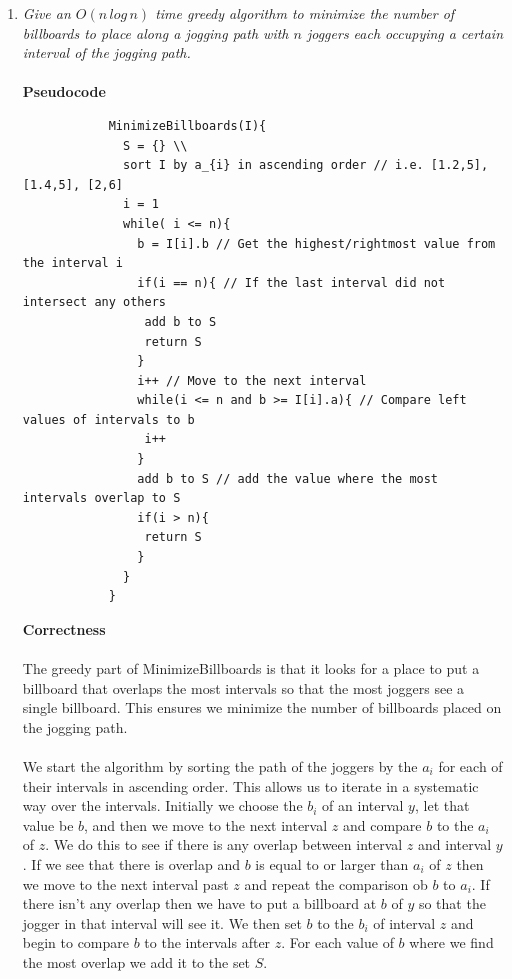 \documentclass[12pt]{article}
\begin{document}
\begin{enumerate}
			\newpage
			\item \textit{Give an $O(n\,log\,n)$ time greedy algorithm to minimize the number of billboards to place along a jogging path with $n$ joggers each occupying a certain interval of the jogging path.}\\
			\\
			\textbf{Pseudocode}\\
			\begin{verbatim}
			MinimizeBillboards(I){
			  S = {} \\ 
			  sort I by a_{i} in ascending order // i.e. [1.2,5], [1.4,5], [2,6]
			  i = 1
			  while( i <= n){
			    b = I[i].b // Get the highest/rightmost value from the interval i
			    if(i == n){ // If the last interval did not intersect any others
			     add b to S
			     return S
			    }
			    i++ // Move to the next interval
			    while(i <= n and b >= I[i].a){ // Compare left values of intervals to b
			     i++ 
			    }
			    add b to S // add the value where the most intervals overlap to S
			    if(i > n){
			     return S
			    }
			  }
			}
			\end{verbatim}
			\textbf{Correctness}\\
			\\
			The greedy part of MinimizeBillboards is that it looks for a place to put a billboard that overlaps the most intervals so that the most joggers see a single billboard.
			This ensures we minimize the number of billboards placed on the jogging path.\\
			\\
			We start the algorithm by sorting the path of the joggers by the $a_i$ for each of their intervals in ascending order.  This allows us to iterate in a systematic way over the intervals.
			Initially we choose the $b_i$ of an interval $y$, let that value be $b$, and then we move to the next interval $z$ and compare $b$ to the $a_i$ of $z$.  
			We do this to see if there is any overlap between interval $z$ and interval $y$.
			If we see that there is overlap and $b$ is equal to or larger than $a_i$ of $z$ then we move to the next interval past $z$ and repeat the comparison ob $b$ to $a_i$. 
			If there isn't any overlap then we have to put a billboard at $b$ of $y$ so that the jogger in that interval will see it.  
			We then set $b$ to the $b_i$ of interval $z$ and begin to compare $b$ to the intervals after $z$.
			For each value of $b$ where we find the most overlap we add it to the set $S$.\\
			\\

\end{enumerate}
\end{document}
